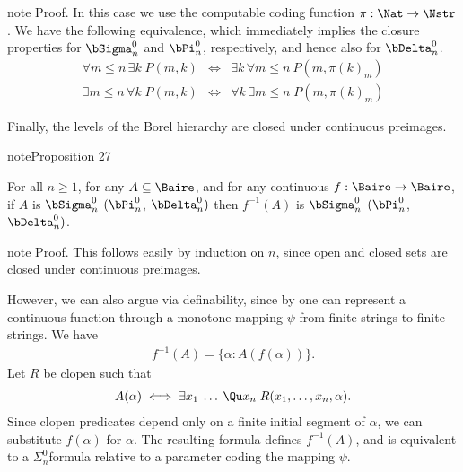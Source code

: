 \documentclass[letterpaper,10pt,english]{jupyterBook}
\begin{document}
\begin{sphinxadmonition}{note}
\sphinxAtStartPar
Proof. In this case we use the computable coding function \(\pi: \Nat \to \Nstr\).
We have the following equivalence, which immediately implies the closure properties for \(\bSigma^0_n\) and \(\bPi^0_n\), respectively, and hence also for \(\bDelta^0_n\).
\begin{eqnarray*}
    \forall m \le n \, \exists k \; P(m,k) &\iff& \exists k  \, \forall m \le n \:  P(m,\pi(k)_m)\\
    \exists m \le n  \, \forall k \; P(m,k) &\iff& \forall k  \, \exists m \le n \;   P(m,\pi(k)_m)
\end{eqnarray*}\end{sphinxadmonition}

\sphinxAtStartPar
Finally, the levels of the Borel hierarchy are closed under continuous preimages.
\label{structureBorel:prop-Borel_closure-preimages}
\begin{sphinxadmonition}{note}{Proposition 27}



\sphinxAtStartPar
For all \(n \geq 1\), for any \(A \subseteq \Baire\), and for any continuous \(f: \Baire \to \Baire\), if \(A\) is \(\bSigma^0_n\) \((\bPi^0_n\), \(\bDelta^0_n)\) then \(f^{-1}(A)\) is \(\bSigma^0_n\) \((\bPi^0_n\), \(\bDelta^0_n)\).
\end{sphinxadmonition}

\begin{sphinxadmonition}{note}
\sphinxAtStartPar
Proof. This follows easily by induction on \(n\), since open and closed sets are closed under continuous preimages.

\sphinxAtStartPar
However, we can also argue via definability, since by {\hyperref[\detokenize{trees:prop-product-continuous}]{}} one can represent a continuous function through a monotone mapping \(\psi\) from finite strings to finite strings.  We have
\begin{equation*}
\begin{split}
    f^{-1}(A) = \{ \alpha \colon A(f(\alpha)) \}.
\end{split}
\end{equation*}
\sphinxAtStartPar
Let \(R\) be clopen such that
\begin{equation*}
\begin{split}
    A(\alpha) \iff \exists x_1 \: \dots \: \Qu x_n \; R(x_1, \dots, x_n, \alpha).
\end{split}
\end{equation*}
\sphinxAtStartPar
Since clopen predicates depend only on a finite initial segment of \(\alpha\), we can substitute \(f(\alpha)\) for \(\alpha\). The resulting formula defines \(f^{-1}(A)\), and is equivalent to a \(\Sigma^0_n\)\sphinxhyphen{}formula relative to a parameter coding the mapping \(\psi\).
\end{sphinxadmonition}
\end{document}
